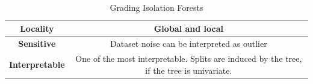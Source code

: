 \begin{table}[htbp]
   \centering
   \begin{tabular}{|c|c|}
      \hline
      \textbf{Locality} & \textbf{Global} and \textbf{local} \\
      \hline
      \textbf{Sensitive} & Dataset noise can be interpreted as outlier \\
      \hline
      \textbf{Interpretable} & One of the most interpretable. Splits are induced by the tree, if the tree is univariate. \\
      \hline
      
   \end{tabular}
   \caption{Grading Isolation Forests}
   \label{tab:06/isolation_forests}
\end{table}